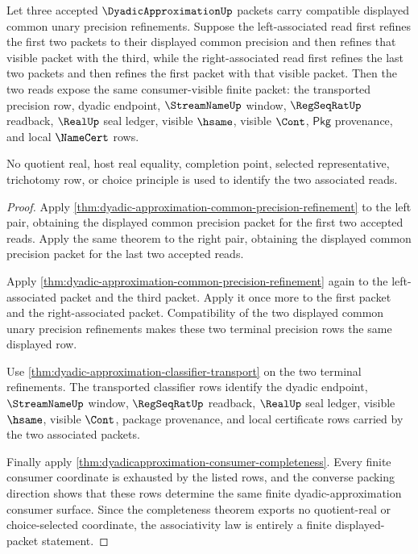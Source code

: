 \begin{theorem}\label{thm:dyadicapproximation-directed-precision-refinement-associativity}
Let three accepted $\DyadicApproximationUp$ packets carry compatible displayed
common unary precision refinements. Suppose the left-associated read first
refines the first two packets to their displayed common precision and then
refines that visible packet with the third, while the right-associated read
first refines the last two packets and then refines the first packet with that
visible packet. Then the two reads expose the same consumer-visible finite
packet: the transported precision row, dyadic endpoint, $\StreamNameUp$
window, $\RegSeqRatUp$ readback, $\RealUp$ seal ledger, visible $\hsame$,
visible $\Cont$, $\mathsf{Pkg}$ provenance, and local $\NameCert$ rows.

No quotient real, host real equality, completion point, selected
representative, trichotomy row, or choice principle is used to identify the
two associated reads.
\end{theorem}
\begin{proof}
Apply \autoref{thm:dyadic-approximation-common-precision-refinement} to the
left pair, obtaining the displayed common precision packet for the first two
accepted reads. Apply the same theorem to the right pair, obtaining the
displayed common precision packet for the last two accepted reads.

Apply \autoref{thm:dyadic-approximation-common-precision-refinement} again to
the left-associated packet and the third packet. Apply it once more to the
first packet and the right-associated packet. Compatibility of the two
displayed common unary precision refinements makes these two terminal
precision rows the same displayed row.

Use \autoref{thm:dyadic-approximation-classifier-transport} on the two
terminal refinements. The transported classifier rows identify the dyadic
endpoint, $\StreamNameUp$ window, $\RegSeqRatUp$ readback, $\RealUp$ seal
ledger, visible $\hsame$, visible $\Cont$, package provenance, and local
certificate rows carried by the two associated packets.

Finally apply \autoref{thm:dyadicapproximation-consumer-completeness}. Every
finite consumer coordinate is exhausted by the listed rows, and the converse
packing direction shows that these rows determine the same finite
dyadic-approximation consumer surface. Since the completeness theorem exports
no quotient-real or choice-selected coordinate, the associativity law is
entirely a finite displayed-packet statement.
\end{proof}

